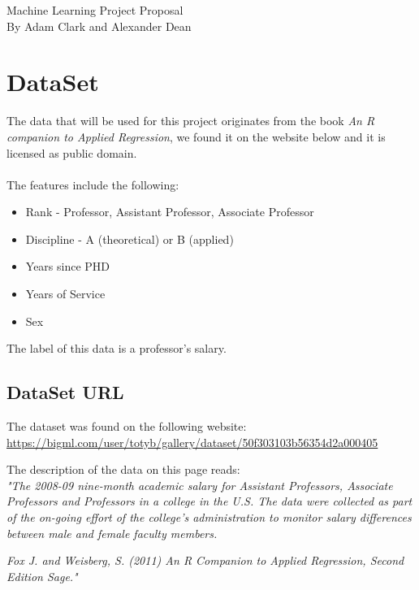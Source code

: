 \documentclass[14pt, letterpaper]{extarticle}
\begin{document}
        \LARGE \center
        Machine Learning Project Proposal\\
        \normalsize
        By Adam Clark and Alexander Dean

        \vspace{\fill}
        \flushleft

        \pagebreak

        \section{DataSet}
        The data that will be used for this project originates from the book {\it{An R companion to Applied Regression}}, we found it on the website below and it is licensed as public domain. 
        \\~\\
        The features include the following:
        \begin{itemize}
            \item Rank - Professor, Assistant Professor, Associate Professor
            \item Discipline - A (theoretical) or B (applied)
            \item Years since PHD
            \item Years of Service 
            \item Sex
        \end{itemize}
        The label of this data is a professor's salary.
        
        \subsection{DataSet URL}
            The dataset was found on the following website:\\ \url{https://bigml.com/user/totyb/gallery/dataset/50f303103b56354d2a000405}
            
            \bigskip
            The description of the data on this page reads:\\
            \bigskip
            \textit{"The 2008-09 nine-month academic salary for Assistant Professors, Associate Professors and Professors in a college in the U.S. The data were collected as part of the on-going effort of the college's administration to monitor salary differences between male and female faculty members.}\bigskip

           \textit{Fox J. and Weisberg, S. (2011) An R Companion to Applied Regression, Second Edition Sage."}
           
\end{document}
